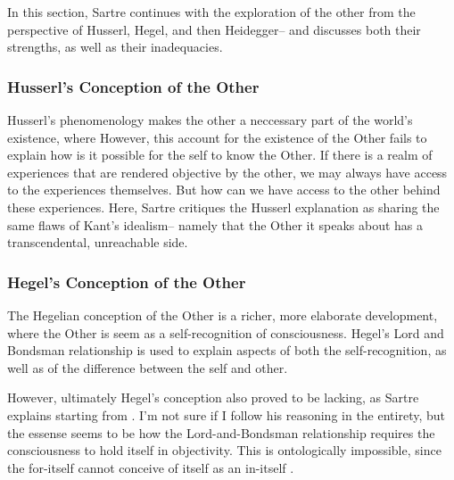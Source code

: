 In this section, Sartre continues with the exploration of the other from the perspective of Husserl, Hegel, and then Heidegger-- and discusses both their strengths, as well as their inadequacies.

\subsubsection*{Husserl's Conception of the Other}

Husserl's phenomenology makes the other a neccessary part of the world's existence, where  However, this account for the existence of the Other fails to explain how is it possible for the self to know the Other.  If there is a realm of experiences that are rendered objective by the other, we may always have access to the experiences themselves. But how can we have access to the other behind these experiences. Here, Sartre critiques the Husserl explanation as sharing the same flaws of Kant's idealism-- namely that the Other it speaks about has a transcendental, unreachable side. 

\subsubsection*{Hegel's Conception of the Other}

The Hegelian conception of the Other \autocite[325 -- 328]{sartre} is a richer, more elaborate development, where the Other is seem as a self-recognition of consciousness. Hegel's Lord and Bondsman relationship is used to explain aspects of both the self-recognition, as well as of the difference between the self and other.

However, ultimately Hegel's conception also proved to be lacking, as Sartre explains starting from \autocite[329]{sartre}. I'm not sure if I follow his reasoning in the entirety, but the essense seems to be how the Lord-and-Bondsman relationship requires the consciousness to hold itself in objectivity. This is ontologically impossible, since the for-itself cannot conceive of itself as an in-itself \autocite[334]{sartre}.

